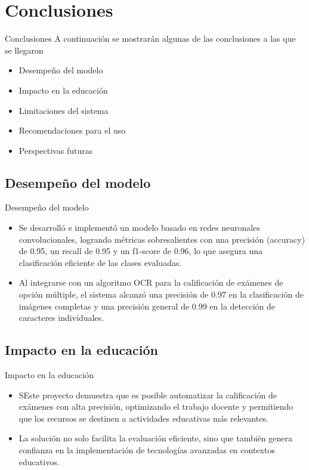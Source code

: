 \documentclass{beamer}
\begin{document}
\section{Conclusiones}
\begin{frame}{Conclusiones}
    A continuación se mostrarán algunas de las conclusiones a las que se llegaron
    \begin{itemize}
        \item Desempeño del modelo
        \item Impacto en la educación 
        \item Limitaciones del sistema 
        \item Recomendaciones para el uso 
        \item Perspectivas futuras
    \end{itemize}
\end{frame}


\subsection{Desempeño del modelo}
\begin{frame}{Desempeño del modelo}
    \begin{itemize}
        \item Se desarrolló e implementó un modelo basado en redes neuronales convolucionales, logrando métricas sobresalientes con una precisión (accuracy) de 0.95, un recall de 0.95 y un f1-score de 0.96, lo que asegura una clasificación eficiente de las clases evaluadas.
        \item Al integrarse con un algoritmo OCR para la calificación de exámenes de opción múltiple, el sistema alcanzó una precisión de 0.97 en la clasificación de imágenes completas y una precisión general de 0.99 en la detección de caracteres individuales.

    \end{itemize}
\end{frame}


\subsection{Impacto en la educación}
\begin{frame}{Impacto en la educación}
    \begin{itemize}
        \item SEste proyecto demuestra que es posible automatizar la calificación de exámenes con alta precisión, optimizando el trabajo docente y permitiendo que los recursos se destinen a actividades educativas más relevantes.
        \item La solución no solo facilita la evaluación eficiente, sino que también genera confianza en la implementación de tecnologías avanzadas en contextos educativos.
    \end{itemize}
\end{frame}
\end{document}

